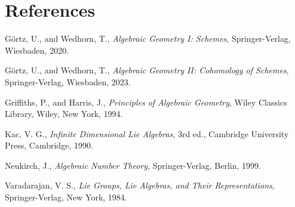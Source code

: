 \documentclass[12pt]{article}
\begin{document}
\section{References}
\begin{enumerate}
    Görtz, U., and Wedhorn, T.,
    \textit{Algebraic Geometry I: Schemes},
    Springer-Verlag, Wiesbaden, 2020.

    Görtz, U., and Wedhorn, T.,
    \textit{Algebraic Geometry II: Cohomology of Schemes},
    Springer-Verlag, Wiesbaden, 2023.

    Griffiths, P., and Harris, J.,
    \textit{Principles of Algebraic Geometry},
    Wiley Classics Library, Wiley, New York, 1994.

    Kac, V. G.,
    \textit{Infinite Dimensional Lie Algebras},
    3rd ed., Cambridge University Press, Cambridge, 1990.

    Neukirch, J.,
    \textit{Algebraic Number Theory},
    Springer-Verlag, Berlin, 1999.

    Varadarajan, V. S.,
    \textit{Lie Groups, Lie Algebras, and Their Representations},
    Springer-Verlag, New York, 1984.
\end{enumerate}
\end{document}

